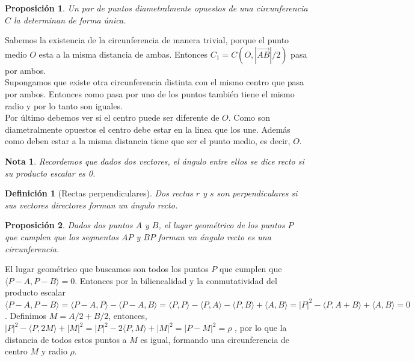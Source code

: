 \documentclass[11pt, a4paper]{article}
\makeatletter
\newif\IfInSansMode
\let\oldsf\sffamily
\renewcommand*{\sffamily}{\oldsf\mathversion{sans}\InSansModetrue}
\let\oldnorm\normalfont
\renewcommand*{\normalfont}{\oldnorm\InSansModefalse\mathversion{normal}}
\renewenvironment{proof}[1][\proofname] {\vspace{-15pt}\par\pushQED{\qed}\normalfont\topsep6\p@\@plus6\p@\relax\trivlist\item[\hskip\labelsep\it#1\@addpunct{.}]\ignorespaces}{\popQED\endtrivlist\@endpefalse}
\renewcommand{\vec}{\overrightarrow}
\renewenvironment{proof}[1][\proofname] {\par\pushQED{\qed}\normalfont\topsep6\p@\@plus6\p@\relax\trivlist\item[\hskip\labelsep\itshape\sffamily#1\@addpunct{.}]\ignorespaces}{\popQED\endtrivlist\@endpefalse}
\theoremstyle{theorem-style}
\newtheorem{nprop}{Proposición}[section]
\theoremstyle{definition-style}
\newtheorem{ndef}{Definición}[section]
\theoremstyle{remark-style}
\newtheorem*{nota}{Nota}
\theoremstyle{example-style}
\makeatother
\begin{document}
\begin{nprop}
  Un par de puntos diametralmente opuestos de una circunferencia $C$ la determinan de forma única.
\end{nprop}
\begin{proof}
	Sabemos la existencia de la circunferencia de manera trivial, porque el punto medio $O$ esta a la misma distancia de ambas. Entonces $C_1 = C(O, |\vec{AB}|/2)$ pasa por ambos. \\
	Supongamos que existe otra circunferencia  distinta con el mismo centro que pasa por ambos. Entonces como pasa por uno de los puntos también tiene el mismo radio y por lo tanto son iguales.\\
	Por último debemos ver si el centro puede ser diferente de $O$. Como son diametralmente opuestos el centro debe estar en la linea que los une. Además como deben estar a la misma distancia tiene que ser el punto medio, es decir, $O$.
\end{proof}

\begin{nota} Recordemos que dados dos vectores, el ángulo entre ellos se dice recto si su producto escalar es 0.
\end{nota}

\begin{ndef}[Rectas perpendiculares]
  Dos rectas $r$ y $s$ son perpendiculares si sus vectores directores forman un ángulo recto.
\end{ndef}

\begin{nprop}
  Dados dos puntos $A$ y $B$, el lugar geométrico de los puntos $P$ que cumplen que los segmentos $AP$ y $BP$ forman un ángulo recto es una circunferencia.
\end{nprop}

\begin{proof}
	El lugar geométrico que buscamos son todos los puntos $P$ que cumplen que $\langle P-A, P-B\rangle =0$. Entonces por la bilienealidad y la conmutatividad del producto escalar $\langle P-A,P-B\rangle  = \langle P-A,P\rangle  - \langle  P-A,B\rangle  = \langle P,P\rangle  - \langle P,A\rangle  - \langle P,B\rangle  + \langle A,B\rangle  = | P|^2 - \langle P,A+B\rangle  + \langle A,B\rangle  = 0  $. Definimos $M=A/2+B/2 $, entonces, $|P|^2 - \langle P,2M\rangle  + |M|^2 = |P|^2 - 2\langle P,M\rangle  + |M|^2 = |P-M|^2 = \rho$ ,  por lo que la distancia de todos estos puntos a $M$ es igual, formando una circunferencia de centro $M$ y radio $\rho$. 
\end{proof}
\end{document}
